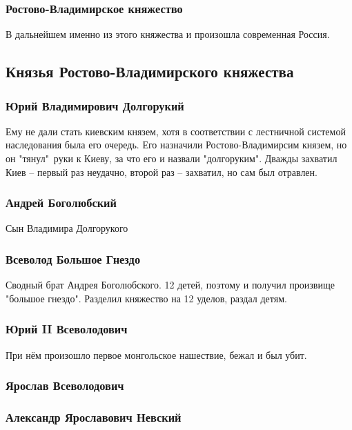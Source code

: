 \subsubsection{Ростово-Владимирское княжество}

В дальнейшем именно из этого княжества и произошла современная Россия.

\subsection{Князья Ростово-Владимирского княжества}

\subsubsection{Юрий Владимирович Долгорукий}

Ему не дали стать киевским князем, хотя в соответствии с лестничной системой наследования была его очередь. Его назначили Ростово-Владимирсим князем, но он "тянул"\ руки к Киеву, за что его и назвали "долгоруким".
Дважды захватил Киев -- первый раз неудачно, второй раз -- захватил, но сам был отравлен.

\subsubsection{Андрей Боголюбский}

Сын Владимира Долгорукого

\subsubsection{Всеволод Большое Гнездо}

Сводный брат Андрея Боголюбского. 12 детей, поэтому и получил произвище "большое гнездо".
Разделил княжество на 12 уделов, раздал детям.

\subsubsection{Юрий II Всеволодович}

При нём произошло первое монгольское нашествие, бежал и был убит.

\subsubsection{Ярослав Всеволодович}

\subsubsection{Александр Ярославович Невский}

